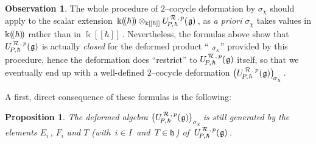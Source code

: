 \documentclass[12pt,reqno,twoside,a4paper]{amsart}
\numberwithin{equation}{section}
\newtheorem{prop}[lema]{Proposition}
\theoremstyle{definition}
\newtheorem{free text}[lema]{}
\newtheorem{obs}[lema]{Observation}
\theoremstyle{remark}
\newcommand{\R}{{\mathcal R}}
\def \kh{{\Bbbk[[\hbar]]}}
\def \khp{{\Bbbk(\hskip-1,7pt(\hbar)\hskip-1,7pt)}}
\def \lieg{\mathfrak{g}}
\def \lieh{\mathfrak{h}}
\def \uRpPhg{U^{\,\R\,,\,p}_{\!P,\hskip0,7pt\hbar}(\hskip0,5pt\lieg)}
\theoremstyle{plain}
\begin{document}
\vskip11pt

\begin{obs}
   The whole procedure of  $ 2 $--cocycle  deformation by  $ \sigma_\chi $  should apply to the scalar extension  $ \, \khp \otimes_\kh \uRpPhg \, $,  as  \textit{a priori\/}  $ \sigma_\chi $  takes values in  $ \khp $  rather than in  $ \kh \, $.  Nevertheless, the formulas above show that
%
%
  $ \uRpPhg $  is actually  \textsl{closed\/}  for the deformed product  ``$ \, \raise-1pt\hbox{$ \, \scriptstyle \dot\sigma_\chi $} $''  provided by this procedure, hence the deformation does ``restrict'' to  $ \uRpPhg $  itself, so that we eventually end up with a well-defined  $ 2 $--cocycle  deformation  $  {\big( \uRpPhg \big)}_{\!\sigma_\chi} \, $.
%
\end{obs}

   A first, direct consequence of these formulas is the following:

\vskip11pt

\begin{prop}  \label{prop: gen's-FoMpQUEA => def-FoMpQUEA}
%
%
 The deformed algebra  $ {\big( \uRpPhg \big)}_{\sigma_\chi} \! $  is still generated by the elements  $ E_i \, $,  $ F_i $  and  $ T $  (with  $ \, i \in I \, $  and  $ \, T \in \lieh \, $)  of  $ \, \uRpPhg \, $.
%
\end{prop}

\vskip7pt
\end{document}
